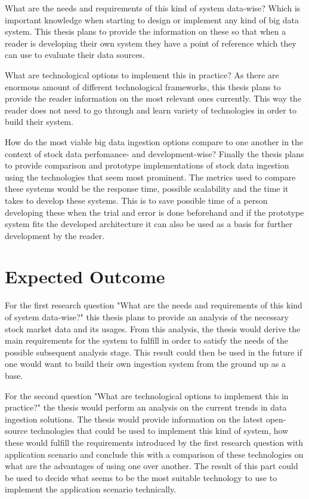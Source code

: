 What are the needs and requirements of this kind of system data-wise?
Which is important knowledge when starting to design or implement any kind of big data system.
This thesis plans to provide the information on these so that when a reader is developing their own system they have a point of reference which they can use to evaluate their data sources.

What are technological options to implement this in practice?
As there are enormous amount of different technological frameworks, this thesis plans to provide the reader information on the most relevant ones currently.
This way the reader does not need to go through and learn variety of technologies in order to build their system.

How do the most viable big data ingestion options compare to one another in the context of stock data perfomance- and development-wise?
Finally the thesis plans to provide comparison and prototype implementations of stock data ingestion using the technologies that seem most prominent.
The metrics used to compare these systems would be the response time, possible scalability and the time it takes to develop these systems.
This is to save possible time of a person developing these when the trial and error is done beforehand and if the prototype system fits the developed architecture it can also be used as a basis for further development by the reader.

\section{Expected Outcome}

For the first research question "What are the needs and requirements of this kind of system data-wise?" this thesis plans to provide an analysis of the necessary stock market data and its usages.
From this analysis, the thesis would derive the main requirements for the system to fulfill in order to satisfy the needs of the possible subsequent analysis stage.
This result could then be used in the future if one would want to build their own ingestion system from the ground up as a base.

For the second question "What are technological options to implement this in practice?" the thesis would perform an analysis on the current trends in data ingestion solutions.
The thesis would provide information on the latest open-source technologies that could be used to implement this kind of system, how these would fulfill the requirements introduced by the first research question with application scenario and conclude this with a comparison of these technologies on what are the advantages of using one over another.
The result of this part could be used to decide what seems to be the most suitable technology to use to implement the application scenario technically. 

